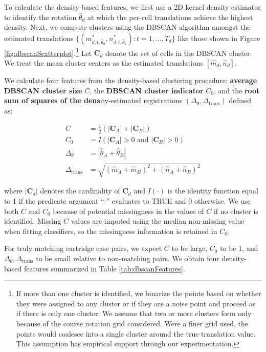 \documentclass[11pt,]{isuthesis}
\let\rmarkdownfootnote\footnote%
\def\footnote{\protect\rmarkdownfootnote}
\begin{document}
To calculate the density-based features, we first use a 2D kernel density estimator \citep{MASS} to identify the rotation \(\hat{\theta}_d\) at which the per-cell translations achieve the highest density.
Next, we compute clusters using the DBSCAN algorithm amongst the estimated translations \(\{(m^*_{d,t,\hat{\theta}_d},n^*_{d,t,\hat{\theta}_d}) : t = 1,...,T_d\}\) like those shown in Figure \ref{fig:dbscanScatterplot}.\footnote{If more than one cluster is identified, we binarize the points based on whether they were assigned to any cluster or if they are a noise point and proceed as if there is only one cluster. We assume that two or more clusters form only because of the course rotation grid considered. Were a finer grid used, the points would coalesce into a single cluster around the true translation value. This assumption has empirical support through our experimentation.}
Let \(\pmb{C}_d\) denote the set of cells in the DBSCAN cluster.
We treat the mean cluster centers as the estimated translations \([\hat{m}_d,\hat{n}_d]\).

We calculate four features from the density-based clustering procedure: \textbf{average DBSCAN cluster size} \(C\), the \textbf{DBSCAN cluster indicator} \(C_0\), and the \textbf{root sum of squares of the dens}ity-estimated registrations \((\Delta_\theta, \Delta_{\text{trans}})\) defined as:

\begin{align*}
C &= \frac{1}{2}\left(|\pmb{C}_A| + |\pmb{C}_B|\right) \\
C_0 &= I(|\pmb{C}_A| > 0 \text{ and } |\pmb{C}_B| > 0)\\
\Delta_\theta &= |\hat{\theta}_A + \hat{\theta}_B| \\
\Delta_{\text{trans}} &= \sqrt{(\hat{m}_A + \hat{m}_B)^2 + (\hat{n}_A + \hat{n}_B)^2}
\end{align*}

where \(|\pmb{C}_d|\) denotes the cardinality of \(\pmb{C}_d\) and \(I(\cdot)\) is the identity function equal to 1 if the predicate argument ``\(\cdot\)'' evaluates to TRUE and 0 otherwise.
We use both \(C\) and \(C_0\) because of potential missingness in the values of \(C\) if no cluster is identified.
Missing \(C\) values are imputed using the median non-missing value when fitting classifiers, so the missingness information is retained in \(C_0\).

For truly matching cartridge case pairs, we expect \(C\) to be large, \(C_0\) to be 1, and \(\Delta_\theta, \Delta_{\text{trans}}\) to be small relative to non-matching pairs. We obtain four density-based features summarized in Table \ref{tab:dbscanFeatures}.
\end{document}
